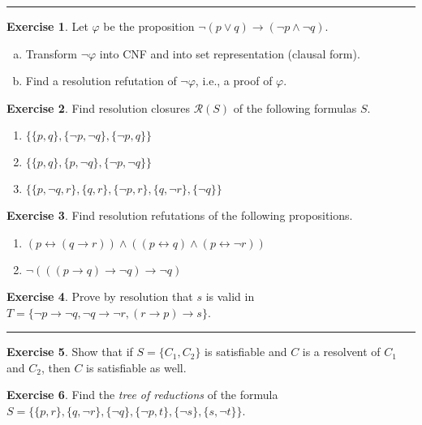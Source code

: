 \documentclass{amsart}
\theoremstyle{definition}
\newtheorem{problem}{Exercise}
\begin{document}
\hrule

\begin{problem}
Let $\varphi$ be the proposition $\neg (p \vee q) \to (\neg p \wedge \neg q)$.
\begin{enumerate}[(a)]
\item Transform $\neg \varphi$ into CNF and into set representation (clausal form).
\item Find a resolution refutation of $\neg \varphi$, i.e., a proof of $\varphi$.
\end{enumerate}
\end{problem}\medskip


\begin{problem}
Find resolution closures $\mathcal{R}(S)$ of the following formulas $S$.
\begin{enumerate}
\item $\{\{p,q\},\{\neg p, \neg q\},\{\neg p, q\}\}$
\item $\{\{p,q\},\{p,\neg q\},\{\neg p,\neg q\}\}$
\item $\{\{p,\neg q,r\},\{q,r\},\{\neg p, r\},\{q,\neg r\},\{\neg q\}\}$
\end{enumerate}
\end{problem}\medskip

\begin{problem}
Find resolution refutations of the following propositions.
\begin{enumerate}
\item $(p\leftrightarrow (q\to r))\wedge((p\leftrightarrow q)\wedge(p\leftrightarrow \neg r))$
\item $\neg(((p\to q)\to \neg q)\to \neg q)$
\end{enumerate}
\end{problem}\medskip


\begin{problem}
Prove by resolution that $s$ is valid in $T=\{\neg p \to \neg q,\neg q \to \neg r, (r\to p)\to s\}$.
\end{problem}\medskip


\hrule


\begin{problem}
Show that if $S=\{C_1,C_2\}$ is satisfiable and $C$ is a resolvent of $C_1$ and $C_2$, then $C$ is satisfiable as well.
\end{problem}\medskip

\begin{problem}
Find the \emph{tree of reductions} of the formula $S=\{\{p,r\},\{q,\neg r\},\{\neg q\},\{\neg p,t\},\{\neg s\},\{s,\neg t\}\}$.
\end{problem}\medskip
\end{document}
